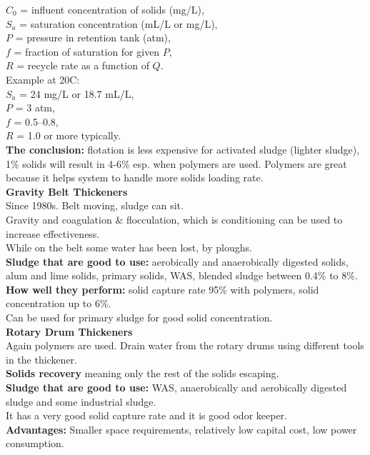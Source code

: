 \documentclass{article}
\numberwithin{equation}{section}
\begin{document}
$C_0$ = influent concentration of solids (mg/L),\\
$S_a$ = saturation concentration (mL/L or mg/L),\\
$P$ = pressure in retention tank (atm),\\
$f$ = fraction of saturation for given $P$,\\
$R$ = recycle rate as a function of $Q$.\\
Example at 20\textdegree C:\\
$S_a$ = 24 mg/L or 18.7 mL/L,\\
$P$ = 3 atm,\\
$f$ = 0.5--0.8,\\
$R$ = 1.0 or more typically.\\
\textbf{The conclusion:} flotation is less expensive for activated sludge (lighter sludge), 1\% solids will result in 4-6\% esp. when polymers are used. Polymers are great because it helps system to handle more solids loading rate.\\
\textbf{Gravity Belt Thickeners}\\
Since 1980s. Belt moving, sludge can sit.\\
Gravity and coagulation \& flocculation, which is conditioning can be used to increase effectiveness.\\
While on the belt some water has been lost, by ploughs.\\
\textbf{Sludge that are good to use:} aerobically and anaerobically digested solids, alum and lime solids, primary solids, WAS, blended sludge between 0.4\% to 8\%.\\
\textbf{How well they perform:} solid capture rate 95\% with polymers, solid concentration up to 6\%.\\
Can be used for primary sludge for good solid concentration.\\
\textbf{Rotary Drum Thickeners}\\
Again polymers are used. Drain water from the rotary drums using different tools in the thickener.\\
\textbf{Solids recovery} meaning only the rest of the solids escaping.\\
\textbf{Sludge that are good to use:} WAS, anaerobically and aerobically digested sludge and some industrial sludge.\\
It has a very good solid capture rate and it is good odor keeper.\\
\textbf{Advantages:} Smaller space requirements, relatively low capital cost, low power consumption.\\
\end{document}
